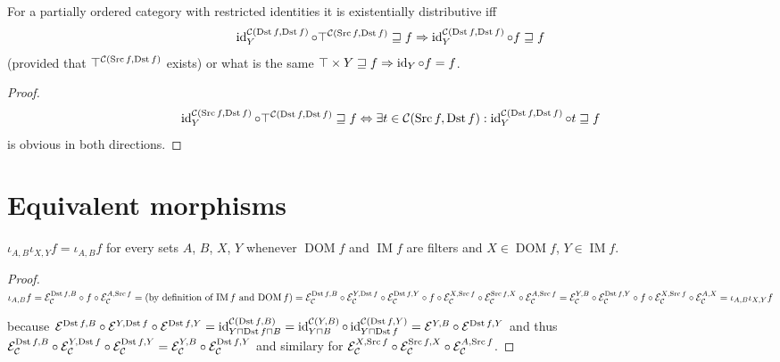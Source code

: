 \begin{prop}
For a partially ordered category with restricted identities
it is existentially distributive iff
\[\operatorname{id}^{\mathcal{C}(\operatorname{Dst} f,\operatorname{Dst} f)}_Y \circ \top^{\mathcal{C}(\operatorname{Src} f,\operatorname{Dst} f)} \sqsupseteq f \Rightarrow \operatorname{id}^{\mathcal{C}(\operatorname{Dst} f,\operatorname{Dst} f)}_Y \circ f
\sqsupseteq f\] (provided that $\top^{\mathcal{C}(\operatorname{Src} f,\operatorname{Dst} f)}$
exists) or what is the same
$\top\times Y \sqsupseteq f \Rightarrow \operatorname{id}_Y \circ f
= f$.
\end{prop}

\begin{proof}
\[\operatorname{id}^{\mathcal{C}(\operatorname{Src} f,\operatorname{Dst} f)}_Y \circ \top^{\mathcal{C}(\operatorname{Dst} f,\operatorname{Dst} f)} \sqsupseteq f \Leftrightarrow
\exists t\in\mathcal{C}(\operatorname{Src} f,\operatorname{Dst} f) : \operatorname{id}^{\mathcal{C}(\operatorname{Dst} f,\operatorname{Dst} f)}_Y \circ t \sqsupseteq f\]
is obvious in both directions.
\end{proof}

\section{Equivalent morphisms}

\begin{prop}\label{two-iotas}
  $\iota_{A, B} \iota_{X, Y} f = \iota_{A, B} f$ for every sets $A$, $B$, $X$,
  $Y$ whenever $\operatorname{DOM} f$ and $\operatorname{IM} f$ are filters and $X \in
  \operatorname{DOM} f$, $Y \in \operatorname{IM} f$.
\end{prop}

\begin{proof}
  $\iota_{A, B} f =\mathcal{E}_{\mathcal{C}}^{\operatorname{Dst} f, B} \circ f \circ
  \mathcal{E}_{\mathcal{C}}^{A, \operatorname{Src} f} = \text{(by definition of
  $\operatorname{IM} f$ and $\operatorname{DOM} f$)} =\mathcal{E}_{\mathcal{C}}^{\operatorname{Dst} f,
  B} \circ \mathcal{E}_{\mathcal{C}}^{Y, \operatorname{Dst} f} \circ
  \mathcal{E}_{\mathcal{C}}^{\operatorname{Dst} f, Y} \circ f \circ
  \mathcal{E}_{\mathcal{C}}^{X, \operatorname{Src} f} \circ
  \mathcal{E}_{\mathcal{C}}^{\operatorname{Src} f, X} \circ
  \mathcal{E}_{\mathcal{C}}^{A, \operatorname{Src} f} =\mathcal{E}_{\mathcal{C}}^{Y,
  B} \circ \mathcal{E}_{\mathcal{C}}^{\operatorname{Dst} f, Y} \circ f \circ
  \mathcal{E}_{\mathcal{C}}^{X, \operatorname{Src} f} \circ
  \mathcal{E}_{\mathcal{C}}^{A, X} = \iota_{A, B} \iota_{X, Y} f$
  
  because $\mathcal{E}^{\operatorname{Dst} f, B} \circ \mathcal{E}^{Y, \operatorname{Dst} f}
  \circ \mathcal{E}^{\operatorname{Dst} f, Y} = \operatorname{id}^{\mathcal{C}(\operatorname{Dst} f, B)}_{Y \sqcap
  \operatorname{Dst} f \sqcap B} = \operatorname{id}^{\mathcal{C}(Y, B)}_{Y \sqcap B} \circ \operatorname{id}^{\mathcal{C}(\operatorname{Dst} f,Y)}_{Y \sqcap \operatorname{Dst} f} = \mathcal{E}^{Y, B} \circ
  \mathcal{E}^{\operatorname{Dst} f, Y}$ and thus
  $\mathcal{E}_{\mathcal{C}}^{\operatorname{Dst} f, B} \circ
  \mathcal{E}_{\mathcal{C}}^{Y, \operatorname{Dst} f} \circ
  \mathcal{E}_{\mathcal{C}}^{\operatorname{Dst} f, Y} =\mathcal{E}_{\mathcal{C}}^{Y,
  B} \circ \mathcal{E}_{\mathcal{C}}^{\operatorname{Dst} f, Y}$ and similary for
  $\mathcal{E}_{\mathcal{C}}^{X, \operatorname{Src} f} \circ
  \mathcal{E}_{\mathcal{C}}^{\operatorname{Src} f, X} \circ
  \mathcal{E}_{\mathcal{C}}^{A, \operatorname{Src} f}$.
\end{proof}

